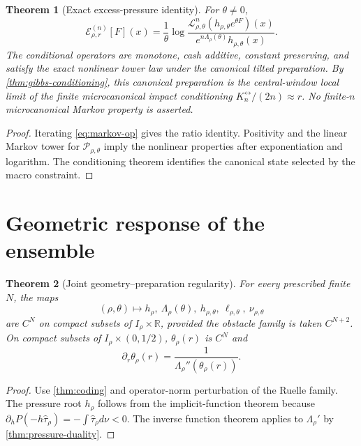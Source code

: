 \documentclass[11pt,reqno]{amsart}
\newtheorem{theorem}{Theorem}[section]
\theoremstyle{definition}
\theoremstyle{remark}
\newcommand{\R}{\mathbb R}
\newcommand{\cE}{\mathcal E}
\newcommand{\cP}{\mathcal P}
\newcommand{\cL}{\mathcal L}
\begin{document}
\begin{theorem}[Exact excess-pressure identity]\label{thm:excess}
For $\theta\ne0$,
\[
 \cE_{\rho,r}^{(n)}[F](x)
 =\frac1\theta\log
 \frac{
 \cL_{\rho,\theta}^{n}
 (h_{\rho,\theta}e^{\theta F})(x)}
 {e^{n\Lambda_\rho(\theta)}h_{\rho,\theta}(x)}.
\]
The conditional operators are monotone, cash additive, constant preserving,
and satisfy the exact nonlinear tower law under the canonical tilted
preparation.  By \cref{thm:gibbs-conditioning}, this canonical preparation is
the central-window local limit of the finite microcanonical impact
conditioning $K_n^{\leftrightarrow}/(2n)\approx r$.  No finite-$n$
microcanonical Markov property is asserted.
\end{theorem}
\begin{proof}
Iterating \eqref{eq:markov-op} gives the ratio identity.  Positivity and the
linear Markov tower for $\cP_{\rho,\theta}$ imply the nonlinear properties
after exponentiation and logarithm.  The conditioning theorem identifies the
canonical state selected by the macro constraint.
\end{proof}

\section{Geometric response of the ensemble}\label{sec:response}
\begin{theorem}[Joint geometry--preparation regularity]\label{thm:regularity}
For every prescribed finite $N$, the maps
\[
 (\rho,\theta)\mapsto
 h_\rho,\ \Lambda_\rho(\theta),\ h_{\rho,\theta},\
 \ell_{\rho,\theta},\ \nu_{\rho,\theta}
\]
are $C^N$ on compact subsets of $I_\rho\times\R$, provided the obstacle family
is taken $C^{N+2}$.  On compact subsets of
$I_\rho\times(0,1/2)$, $\theta_\rho(r)$ is $C^N$ and
\[
 \partial_r\theta_\rho(r)
 =\frac1{\Lambda_\rho''(\theta_\rho(r))}.
\]
\end{theorem}
\begin{proof}
Use \cref{thm:coding} and operator-norm perturbation of the Ruelle family.
The pressure root $h_\rho$ follows from the implicit-function theorem because
$\partial_hP(-h\widehat\tau_\rho)=-\int\widehat\tau_\rho d\nu<0$.
The inverse function theorem applies to $\Lambda_\rho'$ by
\cref{thm:pressure-duality}.
\end{proof}
\end{document}
